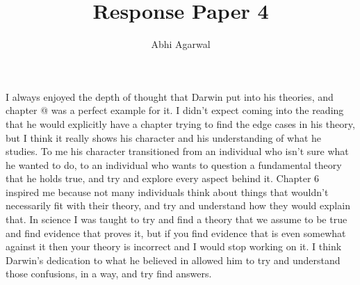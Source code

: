 \documentclass[11pt, oneside]{article}
\title{Response Paper 4}
\author{Abhi Agarwal}
\date{}
\makeatletter
\newcommand*{\rom}[1]{\expandafter\@slowromancap\romannumeral #1@}
\makeatother
\begin{document}
\maketitle

\par I always enjoyed the depth of thought that Darwin put into his theories, and chapter \rom{6} was a perfect example for it. I didn't expect coming into the reading that he would explicitly have a chapter trying to find the edge cases in his theory, but I think it really shows his character and his understanding of what he studies. To me his character transitioned from an individual who isn't sure what he wanted to do, to an individual who wants to question a fundamental theory that he holds true, and try and explore every aspect behind it. Chapter 6 inspired me because not many individuals think about things that wouldn't necessarily fit with their theory, and try and understand how they would explain that. In science I was taught to try and find a theory that we assume to be true and find evidence that proves it, but if you find evidence that is even somewhat against it then your theory is incorrect and I would stop working on it. I think Darwin's dedication to what he believed in allowed him to try and understand those confusions, in a way, and try find answers.

\par 
\end{document}
